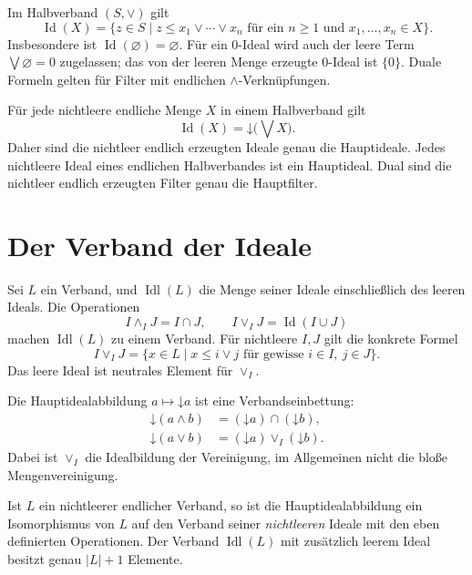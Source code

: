 \begin{theorem}
\label{b45guide:thm:generated-ideal}
Im Halbverband $(S,\vee)$ gilt
\[
 \operatorname{Id}(X)=
 \{z\in S\mid
     z\leq x_1\vee\cdots\vee x_n
     \text{ für ein }n\geq1\text{ und }x_1,\ldots,x_n\in X\}.
\]
Insbesondere ist $\operatorname{Id}(\varnothing)=\varnothing$.
Für ein $0$-Ideal wird auch der leere Term $\bigvee\varnothing=0$
zugelassen; das von der leeren Menge erzeugte $0$-Ideal ist $\{0\}$.
Duale Formeln gelten für Filter mit endlichen
$\wedge$-Verknüpfungen. \cite{nation-ideals}
\end{theorem}

\begin{theorem}
\label{b45guide:thm:finite-ideal}
Für jede nichtleere endliche Menge $X$ in einem Halbverband gilt
\[
 \operatorname{Id}(X)=\mathord\downarrow\!\bigl(\bigvee X\bigr).
\]
Daher sind die nichtleer endlich erzeugten Ideale genau die
Hauptideale. Jedes nichtleere Ideal eines endlichen Halbverbandes
ist ein Hauptideal. Dual sind die nichtleer endlich erzeugten
Filter genau die Hauptfilter.
\end{theorem}

\section{Der Verband der Ideale}

\begin{theorem}
\label{b45guide:thm:ideal-lattice}
Sei $L$ ein Verband, und $\operatorname{Idl}(L)$ die Menge seiner
Ideale einschließlich des leeren Ideals. Die Operationen
\[
 I\wedge_I J=I\cap J,\qquad
 I\vee_I J=\operatorname{Id}(I\cup J)
\]
machen $\operatorname{Idl}(L)$ zu einem Verband.
Für nichtleere $I,J$ gilt die konkrete Formel
\[
 I\vee_I J=\{x\in L\mid
               x\leq i\vee j\text{ für gewisse }i\in I,\ j\in J\}.
\]
Das leere Ideal ist neutrales Element für $\vee_I$.

Die Hauptidealabbildung $a\mapsto\mathord\downarrow a$ ist eine
Verbandseinbettung:
\[
\begin{aligned}
 \mathord\downarrow(a\wedge b)
   &=(\mathord\downarrow a)\cap(\mathord\downarrow b),\\
 \mathord\downarrow(a\vee b)
   &=(\mathord\downarrow a)\vee_I(\mathord\downarrow b).
\end{aligned}
\]
Dabei ist $\vee_I$ die Idealbildung der Vereinigung, im Allgemeinen
nicht die bloße Mengenvereinigung. \cite{nation-ideals}
\end{theorem}

\begin{theorem}
Ist $L$ ein nichtleerer endlicher Verband, so ist die
Hauptidealabbildung ein Isomorphismus von $L$ auf den Verband seiner
\emph{nichtleeren} Ideale mit den eben definierten Operationen.
Der Verband $\operatorname{Idl}(L)$ mit zusätzlich leerem Ideal
besitzt genau $|L|+1$ Elemente.
\end{theorem}
